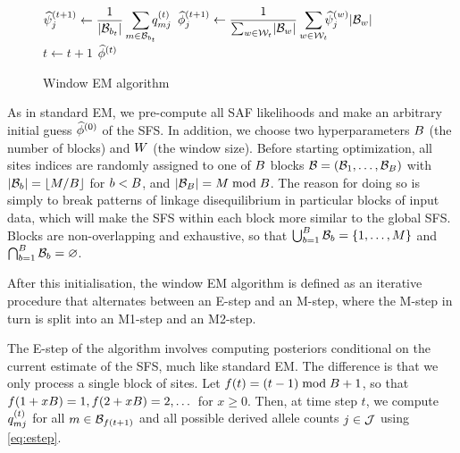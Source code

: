 \begin{figure}[t]
\begin{center}
{\begin{minipage}{0.8\paperwidth}
\begin{algorithm}[H]
{{            \begin{math}
                \displaystyle
                \bsfs[t + 1]_j
                \gets
                \frac{1}{\size{\blockset[b_t]}} 
                \smashoperator[r]{\sum_{m \in \blockset[b_t]}}
                    \post[t]_{mj}
            \end{math}
            \begin{math}
                \displaystyle
                \estsfs[t + 1]_j
                \gets
                \frac{1}{
                    \sum_{w \in \windowset[t]}
                        \size{\blockset[w]}
                }
                \smashoperator[r]{\sum_{w \in \windowset[t]}}
                    \bsfs[w]_j \size{\blockset[w]}
            \end{math}
        }
        $t \gets t + 1$\;
    }
    \Return $\estsfs[t]$
    \caption{Window EM algorithm}
    \label{alg:window}
\end{algorithm}
\end{minipage}
}
\end{center}
\end{figure}

As in standard EM, we pre-compute all SAF likelihoods and make an arbitrary initial guess $\estsfs[0]$ of the SFS.
In addition, we choose two hyperparameters $B$ (the number of blocks) and $W$ (the window size).
Before starting optimization, all sites indices are randomly assigned to one of $B$ blocks $\blockset = \oset{\blockset[1], \dots, \blockset[\blocks]}$ with $\size{\blockset[b]} = \lfloor M / \blocks \rfloor$ for $b < B$, and $\size{\blockset[\blocks]} = M \bmod \blocks$.
The reason for doing so is simply to break patterns of linkage disequilibrium in particular blocks of input data, which will make the SFS within each block more similar to the global SFS.
Blocks are non-overlapping and exhaustive, so that $\bigcup_{b = 1}^{\blocks} \blockset[b] = \set{1, \dots, M}$ and $\bigcap_{b = 1}^{\blocks} \blockset[b] = \varnothing$.

After this initialisation, the window EM algorithm is defined as an iterative procedure that alternates between an E-step and an M-step, where the M-step in turn is split into an M1-step and an M2-step.

The E-step of the algorithm involves computing posteriors conditional on the current estimate of the SFS, much like standard EM.
The difference is that we only process a single block of sites.
Let $f(t) = (t - 1) \bmod B + 1$, so that $f(1 + xB) = 1, f(2 + xB) = 2, \dots$ for $x \geq 0$.
Then, at time step $t$, we compute $\post[t]_{mj}$ for all $m \in \blockset[f(t + 1)]$ and all possible derived allele counts $j \in \mathcal{J}$ using \cref{eq:estep}.


